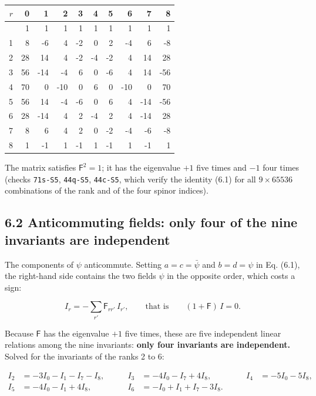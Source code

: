 \documentclass[
  10pt,
]{article}
\begin{document}
\begin{longtable}[]{@{}rrrrrrrrrr@{}}
\toprule\noalign{}
\(r\) & 0 & 1 & 2 & 3 & 4 & 5 & 6 & 7 & 8 \\
\midrule\noalign{}
\endhead
\bottomrule\noalign{}
\endlastfoot
0 & 1 & 1 & 1 & 1 & 1 & 1 & 1 & 1 & 1 \\
1 & 8 & -6 & 4 & -2 & 0 & 2 & -4 & 6 & -8 \\
2 & 28 & 14 & 4 & -2 & -4 & -2 & 4 & 14 & 28 \\
3 & 56 & -14 & -4 & 6 & 0 & -6 & 4 & 14 & -56 \\
4 & 70 & 0 & -10 & 0 & 6 & 0 & -10 & 0 & 70 \\
5 & 56 & 14 & -4 & -6 & 0 & 6 & 4 & -14 & -56 \\
6 & 28 & -14 & 4 & 2 & -4 & 2 & 4 & -14 & 28 \\
7 & 8 & 6 & 4 & 2 & 0 & -2 & -4 & -6 & -8 \\
8 & 1 & -1 & 1 & -1 & 1 & -1 & 1 & -1 & 1 \\
\end{longtable}

The matrix satisfies \(\mathsf F^2=1\); it has the eigenvalue \(+1\)
five times and \(-1\) four times (checks \texttt{71s-S5},
\texttt{44q-S5}, \texttt{44c-S5}, which verify the identity (6.1) for
all \(9\times65536\) combinations of the rank and of the four spinor
indices).

\hypertarget{anticommuting-fields-only-four-of-the-nine-invariants-are-independent}{%
\subsection{6.2 Anticommuting fields: only four of the nine invariants
are
independent}\label{anticommuting-fields-only-four-of-the-nine-invariants-are-independent}}

The components of \(\psi\) anticommute. Setting \(a=c=\bar\psi\) and
\(b=d=\psi\) in Eq. (6.1), the right-hand side contains the two fields
\(\psi\) in the opposite order, which costs a sign:

\[I_r=-\sum_{r'}\mathsf F_{rr'}\,I_{r'},\qquad\text{that is}\qquad(1+\mathsf F)\,I=0.\tag{6.2}\]

Because \(\mathsf F\) has the eigenvalue \(+1\) five times, these are
five independent linear relations among the nine invariants:
\textbf{only four invariants are independent.} Solved for the invariants
of the ranks 2 to 6:

\[\begin{aligned}
I_2&=-3I_0-I_1-I_7-I_8,&\qquad I_3&=-4I_0-I_7+4I_8,&\qquad I_4&=-5I_0-5I_8,\\
I_5&=-4I_0-I_1+4I_8,&\qquad I_6&=-I_0+I_1+I_7-3I_8.
\end{aligned}\tag{6.3}\]
\end{document}
